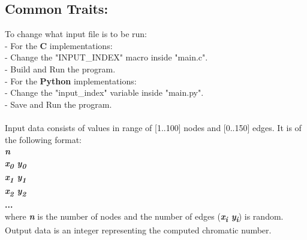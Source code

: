 \documentclass[12pt]{article}
\begin{document}
\subsection{Common Traits:}
To change what input file is to be run: \\
\indent - For the {\bf C} implementations: \\
\indent \indent - Change the "INPUT\_INDEX" macro inside "main.c". \\
\indent \indent - Build and Run the program. \\
\indent - For the {\bf Python} implementations: \\
\indent \indent - Change the "input\_index" variable inside "main.py". \\
\indent \indent - Save and Run the program. \\ \\
\indent Input data consists of values in range of [1..100] nodes and [0..150] edges. It is of the following format:\\
\textit{\textbf{n}} \\
\textit{\textbf{x\textsubscript{0} y\textsubscript{0}}} \\
\textit{\textbf{x\textsubscript{1} y\textsubscript{1}}} \\
\textit{\textbf{x\textsubscript{2} y\textsubscript{2}}} \\
\textbf{...} \\
where \textit{\textbf{n}} is the number of nodes and the number of edges (\textit{\textbf{x\textsubscript{i} y\textsubscript{i}}}) is random.
Output data is an integer representing the computed chromatic number.
\end{document}
